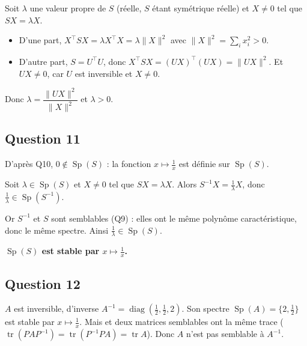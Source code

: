 \documentclass[11pt,a4paper]{article}
\providecommand{\tightlist}{\setlength{\itemsep}{0pt}\setlength{\parskip}{0pt}}
\newcommand{\equationajustee}[1]{%
  \sbox{\boiteequation}{$\displaystyle #1$}%
  \ifdim\wd\boiteequation>\linewidth
    \[\resizebox{\linewidth}{!}{\usebox{\boiteequation}}\]%
  \else
    \[#1\]%
  \fi}
\begin{document}
Soit \(\lambda\) une valeur propre de \(S\) (réelle, \(S\) étant symétrique réelle) et \(X\neq0\) tel que \(SX=\lambda X\).

\begin{itemize}
\tightlist
\item
  D'une part, \(X^\top SX=\lambda X^\top X=\lambda\|X\|^2\) avec \(\|X\|^2=\sum_i x_i^2>0\).
\item
  D'autre part, \(S=U^\top U\), donc \(X^\top SX=(UX)^\top(UX)=\|UX\|^2\). Et \(UX\neq0\), car \(U\) est inversible et \(X\neq0\).
\end{itemize}

Donc \(\lambda=\dfrac{\|UX\|^2}{\|X\|^2}\) et \(\boxed{\lambda>0}\).

\hypertarget{question-11}{%
\subsection{Question 11}\label{question-11}}

D'après Q10, \(0\notin\operatorname{Sp}(S)\) : la fonction \(x\mapsto\frac1x\) est définie sur \(\operatorname{Sp}(S)\).

Soit \(\lambda\in\operatorname{Sp}(S)\) et \(X\neq0\) tel que \(SX=\lambda X\). Alors \(S^{-1}X=\frac1\lambda X\), donc \(\frac1\lambda\in\operatorname{Sp}(S^{-1})\).

Or \(S^{-1}\) et \(S\) sont semblables (Q9) : elles ont le même polynôme caractéristique, donc le même spectre. Ainsi \(\frac1\lambda\in\operatorname{Sp}(S)\).

\textbf{\(\operatorname{Sp}(S)\) est stable par \(x\mapsto\frac1x\).}

\hypertarget{question-12}{%
\subsection{Question 12}\label{question-12}}

\(A\) est inversible, d'inverse \(A^{-1}=\operatorname{diag}(\frac12,\frac12,2)\). Son spectre \(\operatorname{Sp}(A)=\{2,\frac12\}\) est stable par \(x\mapsto\frac1x\). Mais
\equationajustee{\begin{aligned}
\operatorname{tr}A&=\tfrac92,\\
\operatorname{tr}A^{-1}&=3,
\end{aligned}}
et deux matrices semblables ont la même trace (\(\operatorname{tr}(PAP^{-1})=\operatorname{tr}(P^{-1}PA)=\operatorname{tr}A\)). Donc \(A\) n'est pas semblable à \(A^{-1}\).
\end{document}
